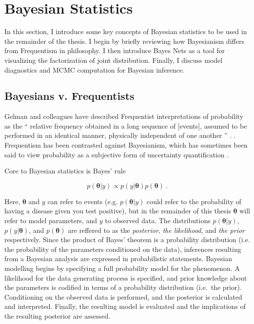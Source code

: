 \section{Bayesian Statistics}

In this section, I introduce some key concepts of Bayesian statistics to be used in the remainder of the thesis.  I begin by briefly reviewing how Bayesianism differs from Frequentism in philosophy.  I then introduce Bayes Nets as a tool for visualizing the factorization of joint distribution.  Finally, I discuss model diagnostics and MCMC computation for Bayesian inference.


\subsection{Bayesians v. Frequentists}


Gelman and colleagues have described Frequentist interpretations of probability as the `` relative frequency obtained in a long sequence of [events], assumed to be performed in an identical manner, physically independent of one another ''   \cite[p.~12]{gelman2013bayesian}. .   Frequentism has been contrasted against Bayesianism, which has sometimes been said to view probability as a subjective form of uncertainty quantification \cite{gelman2013bayesian}.

Core to Bayesian statistics is Bayes' rule \cite[p.~7]{gelman2013bayesian}

\begin{equation}\label{Bayes}
	p( \bm{\theta} \vert y) \propto p(y \vert \bm{\theta}) p(\bm{\theta}) \>.
\end{equation}

\noindent  Here, $ \bm{\theta} $  and $y$ can refer to events (e.g. $p(\bm{\theta} \vert y)$ could refer to the probability of having a disease given you test positive), but in the remainder of this thesis $\bm{\theta}$ will refer to model parameters, and $ y $ to observed data.  The distributions $ p( \bm{\theta} \vert y) $, $ p(y \vert \bm{\theta}) $, and $p(\bm{\theta})$ are reffered to as the \textit{posterior}, \textit{the likelihood}, and \textit{the prior} respectively.  Since the product of Bayes' theorem is a probability distribution (i.e. the probability of the parameters conditioned on the data), inferences resulting from a Bayesian analysis are expressed in probabilistic statements. Bayesian modelling begins by specifying a full probability model for the phenomenon.  A likelihood for the data generating process is specified, and prior knowledge about the parameters is codified in terms of a probability distribution (i.e.\ the prior).  Conditioning on the observed data is performed, and the posterior is calculated and interpreted.  Finally, the resulting model is evaluated and the implications of the resulting posterior are assessed.  

